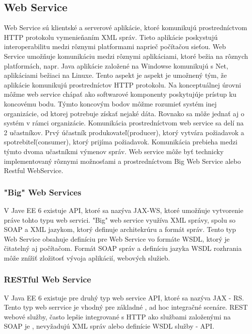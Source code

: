\subsection{Web Service}
Web Service  sú klientské a serverové aplikácie, ktoré komunikujú prostredníctvom HTTP protokolu vymenieňaním XML správ. Tieto aplikácie poskystujú interoperabilitu medzi rôznymi platformami naprieč počítačou sieťou. Web Service umožňuje komunikáciu medzi rôznymi aplikáciami, ktoré bežia na rôznych platformách, napr. Java aplikácie založené na Windowse komunikujú s Net, aplikáciami bežiaci na Linuxe. Tento aspekt je aspekt je umožnený tým, že aplikácie komunikujú prostredníctov HTTP protokolu. Na konceptuálnej úrovni môžme web service chápať ako softwarové komponenty poskytujúje prístup ku koncovému bodu. Týmto koncovým bodov môžme rozumieť systém inej organizácie, od ktorej potrebuje získať nejaké dáta. Rovnako sa môže jednať aj o systém v rámci organizácie. Komunikácia prostredníctvom web service sa delí na 2 učastníkov. Prvý účastník produkovateľ(producer), ktorý vytvára požiadavok a spotrebiteľ(consumer), ktorý prijíma požiadavok. Komunikácia prebieha medzi týmto dvoma učastníkmi výmenov správ. Web service môže byť technicky implementovaný rôznymi možnosťami a prostredníctvom Big Web Service alebo Restful WebService.

\subsubsection{"Big" Web Services}
V Jave EE 6 existuje API, ktoré sa nazýva JAX-WS, ktoré umožňuje vytvorenie práve tohto typu web servici.\cite{fitWeb} "Big" web service využíva XML správy, spolu so SOAP a XML jazykom, ktorý definuje architekrúru a formát správ. Tento typ Web Service obsahuje definíciu pre Web Service vo formáte WSDL, ktorý je čitatelný aj počítačom. Formát SOAP správ a definíciu jazyka WSDL rozhrania môže znížiť zložitosť vývoja aplikácií, webových služieb. 

\subsubsection{RESTful Web Service}
V Java EE 6 existuje pre druhý typ web service API, ktoré sa nazýva JAX - RS. Tento typ web serrvice je vhodný pre základné , ad hoc integračné scenáre. REST webové služby, často lepšie integrované s HTTP ako službami založenými na SOAP je , nevyžadujú XML správ alebo definície WSDL služby - API.

